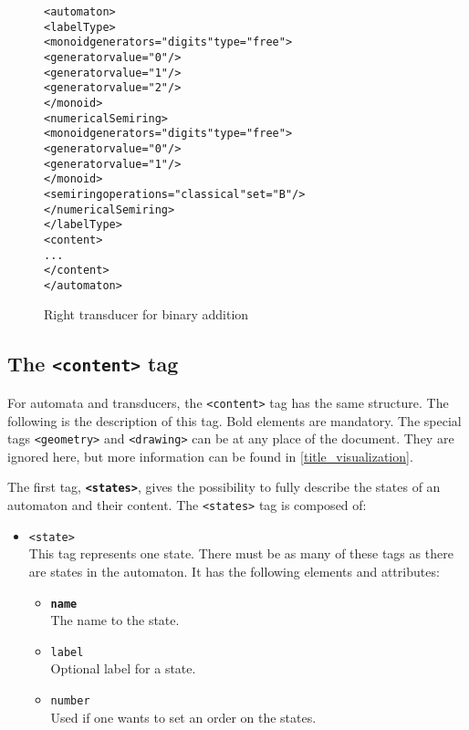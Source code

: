 \documentclass[a4paper]{article}
\newcommand{\xtag}[1]{\texttt{<#1>}}
\newcommand{\xattr}[1]{\texttt{#1}}
\begin{document}
\begin{figure}[ht]
  \begin{center}
\begin{alltt}
<automaton>
  <labelType>
    <monoid generators="digits" type="free">
      <generator value="0"/>
      <generator value="1"/>
      <generator value="2"/>
    </monoid>
    <numericalSemiring>
      <monoid generators="digits" type="free">
        <generator value="0"/>
        <generator value="1"/>
      </monoid>
      <semiring operations="classical" set="B"/>
    </numericalSemiring>
  </labelType>
  <content>
    ...
  </content>
</automaton>
\end{alltt}
\caption{Right transducer for binary addition}
\label{ratseries1}
  \end{center}
\end{figure}

\subsection{The \xtag{content} tag}

For automata and transducers, the \xtag{content} tag has the same
structure.  The following is the description of this tag. Bold
elements are mandatory.  The special tags \xtag{geometry} and
\xtag{drawing} can be at any place of the document. They are ignored
here, but more information can be found in
\autoref{title_visualization}.

\medskip

The first tag, \textbf{\xtag{states}}, gives the possibility to fully
describe the states of an automaton and their content. The
\xtag{states} tag is composed of:
\begin{itemize}
\item \xtag{state}\\
  This tag represents one state. There must be as many of these tags
  as there are states in the automaton. It has the following
  elements and attributes:
  \begin{itemize}
  \item \textbf{\xattr{name}}\\
    The name to the state.
  \item \xattr{label}\\
    Optional label for a state.
  \item \xattr{number}\\
    Used if one wants to set an order on the states.~\\
  \end{itemize}
\end{itemize}
\end{document}
